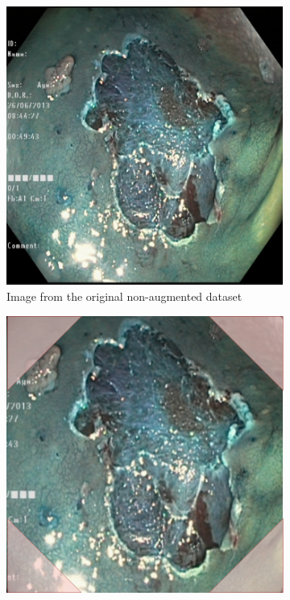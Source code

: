 \begin{figure}[h]
     \centering
     \begin{subfigure}[t]{0.37\textwidth}
         \centering
         \includegraphics[width=\textwidth]{methodology/figures/nomask.png}
         \caption{Image from the original non-augmented dataset}
         \label{fig:CornerMask}
     \end{subfigure}
     \hspace*{2cm}
     \begin{subfigure}[t]{0.37\textwidth}
         \centering
         \includegraphics[width=\textwidth]{methodology/figures/cornermask.png}

\end{subfigure}
\end{figure}
